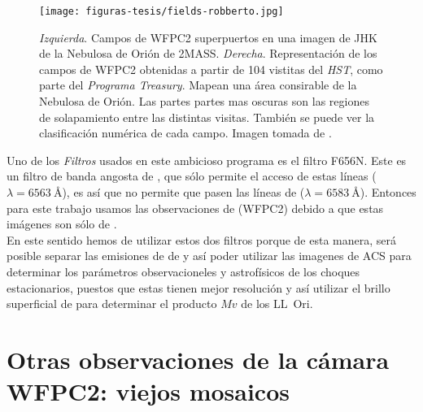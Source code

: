 \begin{figure}
  \centering
  \texttt{[image: figuras-tesis/fields-robberto.jpg]}
  \caption{\textit{Izquierda}. Campos de WFPC2 superpuertos en una imagen de JHK de la Nebulosa de Orión de 2MASS. \textit{Derecha}. Representación de los campos de WFPC2 obtenidas a partir de 104 vistitas del \textit{HST}, como parte del \textit{Programa Treasury}. Mapean una área consirable de la Nebulosa de Orión. Las partes partes mas oscuras son las regiones de solapamiento entre las distintas visitas. También se puede ver la clasificación numérica de cada campo. Imagen tomada de \citet{Robberto:2013a}.}
  \label{fig:fields-robberto}
\end{figure}

Uno de los \textit{Filtros} usados en este ambicioso programa es el filtro F656N. Este es un filtro de banda angosta de \ha{}, que sólo permite el acceso de estas líneas (\ha{}~\(\lambda = 6563~\text{\AA{}}\)), es así que no permite que pasen las líneas de \nii{} (\(\lambda = 6583~\text{\AA{}}\)). Entonces para este trabajo usamos las observaciones de \citet{Robberto:2013a} (WFPC2) debido a que estas imágenes son sólo de \ha{}.\\

 En este sentido hemos de utilizar estos dos filtros porque de esta manera, será posible separar las emisiones de \ha{} de \nii{} y así poder utilizar las imagenes de ACS para determinar los parámetros observacioneles y astrofísicos de los choques estacionarios, puestos que estas tienen mejor resolución y así utilizar el brillo superficial de \ha{} para determinar el producto \(Mv\) de los LL~Ori.

\section{Otras observaciones de la cámara WFPC2:  viejos mosaicos}
\label{sec:mosaic}

